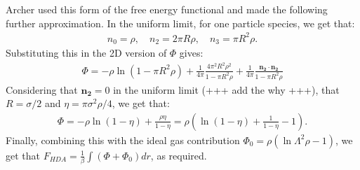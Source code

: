 \documentclass[11pt, a4paper]{article}
\theoremstyle{definition}
\begin{document}
Archer used this form of the free energy functional and made the following further approximation. In the uniform limit, for one particle species, we get that:
\begin{align*}
	n_0 = \rho, \quad n_2 = 2 \pi R \rho, \quad n_3 = \pi R^2 \rho.
\end{align*}
Substituting this in the 2D version of $\Phi$ gives:
\begin{align*}
	\Phi = - \rho \ln (1- \pi R^2 \rho) + \frac{1}{4 \pi} \frac{4\pi^2 R^2 \rho^2}{1 - \pi R^2 \rho} + \frac{1}{4 \pi}\frac{\mathbf{n_2} \cdot \mathbf{n_2}}{1 - \pi R^2 \rho}
\end{align*}
Considering that $\mathbf{n_2} = 0$ in the uniform limit (+++ add the why +++), that $R = \sigma/2$ and $\eta = \pi \sigma^2 \rho /4$, we get that:
\begin{align*}
	\Phi = - \rho \ln (1- \eta) + \frac{\rho \eta}{1 - \eta} = \rho \left(\ln(1-\eta) + \frac{1}{1- \eta} -1 \right).
\end{align*} 
Finally, combining this with the ideal gas contribution $\Phi_{0} = \rho\left(\ln \Lambda^2 \rho - 1\right)$, we get that $F_{HDA} = \frac{1}{\beta} \int (\Phi + \Phi_0) dr$, as required.
\end{document}
